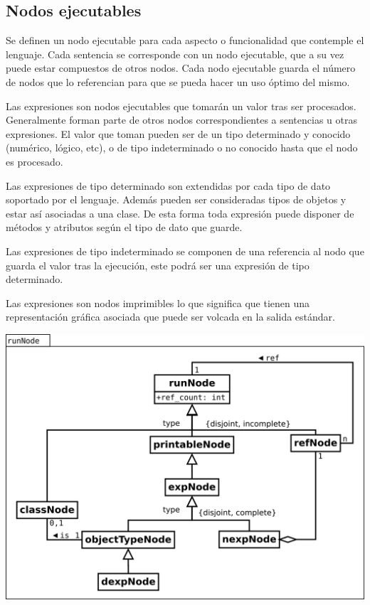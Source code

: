 \subsection{Nodos ejecutables}
Se definen un nodo ejecutable para cada aspecto o funcionalidad que contemple el lenguaje.
Cada sentencia se corresponde con un nodo ejecutable, que a su vez puede estar compuestos de otros
nodos. Cada nodo ejecutable guarda el número de nodos que lo referencian para que se pueda hacer un uso 
óptimo del mismo.

Las expresiones son nodos ejecutables que tomarán un valor tras ser procesados. Generalmente forman parte de otros 
nodos correspondientes a sentencias u otras expresiones. El valor que toman pueden ser de un tipo determinado y conocido (numérico, lógico, etc), 
o de tipo indeterminado o no conocido hasta que el nodo es procesado. 

Las expresiones de tipo determinado son extendidas por cada tipo de dato soportado por el lenguaje. Además 
pueden ser consideradas tipos de objetos y estar así asociadas a una clase. De esta forma toda expresión puede disponer
de métodos y atributos según el tipo de dato que guarde.

Las expresiones de tipo indeterminado se componen de una referencia al nodo que guarda el valor tras la ejecución, este podrá ser una 
expresión de tipo determinado.

Las expresiones son nodos imprimibles lo que significa que tienen una representación gráfica asociada que puede ser volcada en la
salida estándar.

\begin{center}
\includegraphics[scale=0.4]{runNode.png} \\
\end{center}
\pagebreak
